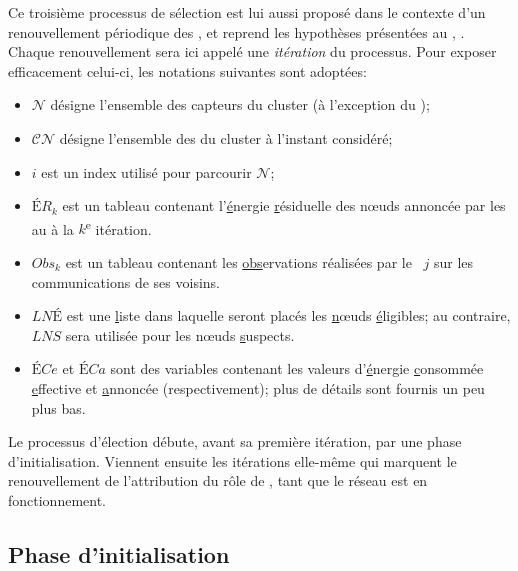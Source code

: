Ce troisième processus de sélection est lui aussi proposé dans le contexte d'un renouvellement périodique des \cns, et reprend les hypothèses présentées au , .
Chaque renouvellement sera ici appelé une \emph{itération} du processus.
Pour exposer efficacement celui-ci, les notations suivantes sont adoptées:
\begin{itemize}
    \item $\mathcal{N}$ désigne l'ensemble des capteurs du cluster (à l'exception du \ch);
    \item $\mathcal{CN}$ désigne l'ensemble des \cns du cluster à l'instant considéré;
    \item $i$ est un index utilisé pour parcourir $\mathcal{N}$;
    \item $\mathit{ÉR}_k$ est un tableau contenant l'\underline{é}nergie \underline{r}ésiduelle des nœuds annoncée par les \cns au \ch à la $k$\textsuperscript{e} itération.
    \item $\mathit{Obs}_k$ est un tableau contenant les \underline{obs}ervations réalisées par le \cn~$j$ sur les communications de ses voisins.
    \item $\mathit{LNÉ}$ est une \underline{l}iste dans laquelle seront placés les \underline{n}œuds \underline{é}ligibles; au contraire, $\mathit{LNS}$ sera utilisée pour les nœuds \underline{s}uspects.
    \item $\mathit{ÉCe}$ et $\mathit{ÉCa}$ sont des variables contenant les valeurs d'\underline{é}nergie \underline{c}onsommée \underline{e}ffective et \underline{a}nnoncée (respectivement); plus de détails sont fournis un peu plus bas.
\end{itemize}

Le processus d'élection débute, avant sa première itération, par une phase d'initialisation.
Viennent ensuite les itérations elle-même qui marquent le renouvellement de l'attribution du rôle de \cn, tant que le réseau est en fonctionnement.

    \subsection{Phase d'initialisation}

